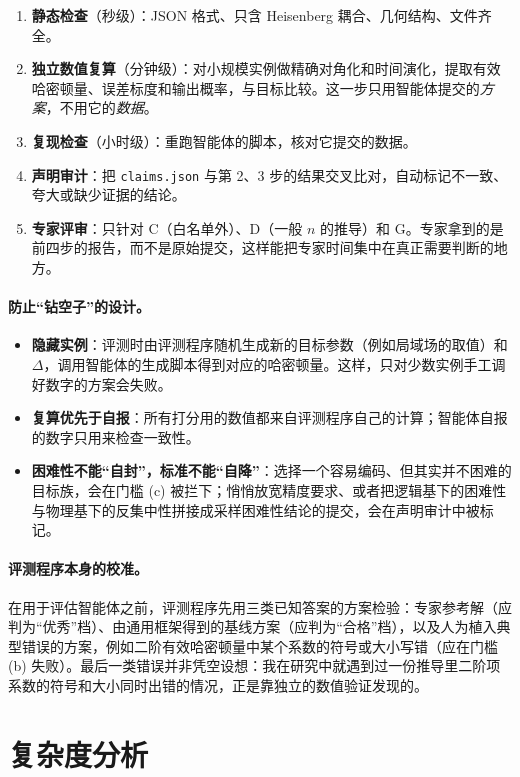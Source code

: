 \documentclass[11pt,a4paper,fontset=none]{ctexart}
\begin{document}
\begin{enumerate}[label=\textbf{\arabic*.},leftmargin=1.5em]
  \item \textbf{静态检查}（秒级）：JSON 格式、只含 Heisenberg 耦合、几何结构、文件齐全。
  \item \textbf{独立数值复算}（分钟级）：对小规模实例做精确对角化和时间演化，提取有效哈密顿量、误差标度和输出概率，与目标比较。这一步只用智能体提交的\emph{方案}，不用它的\emph{数据}。
  \item \textbf{复现检查}（小时级）：重跑智能体的脚本，核对它提交的数据。
  \item \textbf{声明审计}：把 \texttt{claims.json} 与第 2、3 步的结果交叉比对，自动标记不一致、夸大或缺少证据的结论。
  \item \textbf{专家评审}：只针对 C（白名单外）、D（一般 $n$ 的推导）和 G。专家拿到的是前四步的报告，而不是原始提交，这样能把专家时间集中在真正需要判断的地方。
\end{enumerate}

\paragraph{防止“钻空子”的设计。}
\begin{itemize}
  \item \textbf{隐藏实例}：评测时由评测程序随机生成新的目标参数（例如局域场的取值）和 $\Delta$，调用智能体的生成脚本得到对应的哈密顿量。这样，只对少数实例手工调好数字的方案会失败。
  \item \textbf{复算优先于自报}：所有打分用的数值都来自评测程序自己的计算；智能体自报的数字只用来检查一致性。
  \item \textbf{困难性不能“自封”，标准不能“自降”}：选择一个容易编码、但其实并不困难的目标族，会在门槛 (c) 被拦下；悄悄放宽精度要求、或者把逻辑基下的困难性与物理基下的反集中性拼接成采样困难性结论的提交，会在声明审计中被标记。
\end{itemize}

\paragraph{评测程序本身的校准。}在用于评估智能体之前，评测程序先用三类已知答案的方案检验：专家参考解（应判为“优秀”档）、由通用框架得到的基线方案（应判为“合格”档），以及人为植入典型错误的方案，例如二阶有效哈密顿量中某个系数的符号或大小写错（应在门槛 (b) 失败）。最后一类错误并非凭空设想：我在研究中就遇到过一份推导里二阶项系数的符号和大小同时出错的情况，正是靠独立的数值验证发现的。

\section{复杂度分析}
\end{document}
